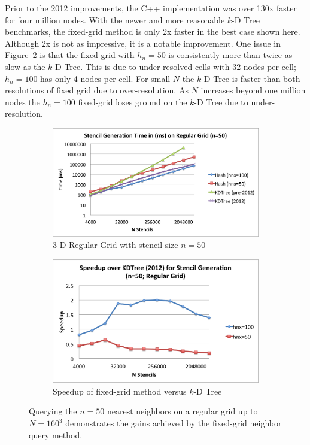 \documentclass{report}
\begin{document}
Prior to the 2012 improvements, the C++ implementation was over 130x faster for four million nodes. With the newer and more reasonable $k$-D Tree benchmarks, the fixed-grid method is only 2x faster in the best case shown here. Although 2x is not as impressive, it is a notable improvement. One issue in Figure~\ref{fig:stencil_query_old_and_new} is that the fixed-grid with $h_n=50$ is consistently more than twice as slow as the $k$-D Tree. This is due to under-resolved cells with 32 nodes per cell; $h_n=100$ has only 4 nodes per cell. For small $N$ the $k$-D Tree is faster than both resolutions of fixed grid due to over-resolution. As $N$ increases beyond one million nodes the $h_n=100$ fixed-grid loses ground on the $k$-D Tree due to under-resolution. 


\begin{figure}
\centering
\begin{subfigure}{11cm}
\centering
\includegraphics[width=\textwidth]{../figures/stencils/kdtree_old_reg_subsets_4m_stencil_gen_time.png}
\caption{3-D Regular Grid with stencil size $n=50$}
\label{fig:sten_query_a}
\end{subfigure}
\begin{subfigure}{9.5cm}
\centering
\includegraphics[width=\textwidth]{../figures/stencils/reg_subsets_4m_stencil_gen_speedup.png}
\caption{Speedup of fixed-grid method versus $k$-D Tree}
\end{subfigure}
\caption{Querying the $n=50$ nearest neighbors on a regular grid up to $N=160^3$ demonstrates the gains achieved by the fixed-grid neighbor query method.}
\label{fig:stencil_query_old_and_new}
\end{figure}
\end{document}
